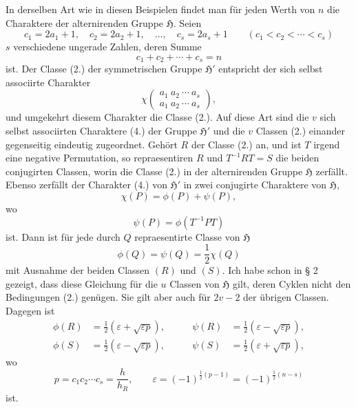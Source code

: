 \documentclass[11pt]{article}
\newcommand{\Hgr}{\mathfrak{H}}
\newcommand{\eps}{\varepsilon}
\newcommand{\ch}[2]{\left(\begin{smallmatrix}#1\\#2\end{smallmatrix}\right)}
\begin{document}
In derselben Art wie in diesen Beispielen findet man für jeden Werth von $n$ die Charaktere der alternirenden Gruppe $\Hgr$. Seien
\begin{equation}\tag{2.}
 c_1=2a_1+1,	\quad c_2=2a_2+1,	\quad \ldots,	\quad c_s=2a_s+1\qquad(c_1<c_2<\cdots<c_s)
\end{equation}
$s$ verschiedene ungerade Zahlen, deren Summe
\begin{equation}\tag{3.}
 c_1+c_2+\cdots+c_s=n
\end{equation}
ist. Der Classe (2.) der symmetrischen Gruppe $\Hgr'$ entspricht der sich selbst associirte Charakter
\begin{equation}\tag{4.}
 \chi\ch{a_1\ a_2\ \cdots\ a_s}{a_1\ a_2\ \cdots\ a_s},
\end{equation}
und umgekehrt diesem Charakter die Classe (2.). Auf diese Art sind die $v$ sich selbst associirten Charaktere (4.) der Gruppe $\Hgr'$ und die $v$ Classen (2.) einander gegenseitig eindeutig zugeordnet. Gehört $R$ der Classe (2.) an, und ist $T$ irgend eine negative Permutation, so repraesentiren $R$ und $T^{-1}RT=S$ die beiden conjugirten Classen, worin die Classe (2.) in der alternirenden Gruppe $\Hgr$ zerfällt. Ebenso zerfällt der Charakter (4.) von $\Hgr'$ in zwei conjugirte Charaktere von $\Hgr$,
\begin{equation}\tag{5.}
 \chi(P)=\phi(P)+\psi(P),
\end{equation}
wo
\[
 \psi(P)=\phi(T^{-1}PT)
\]
ist. Dann ist für jede durch $Q$ repraesentirte Classe von $\Hgr$
\begin{equation}\tag{6.}
 \phi(Q)=\psi(Q)=\frac12\chi(Q)
\end{equation}
mit Ausnahme der beiden Classen $(R)$ und $(S)$. Ich habe schon in § 2 gezeigt, dass diese Gleichung für die $u$ Classen von $\Hgr$ gilt, deren Cyklen nicht den Bedingungen (2.) genügen. Sie gilt aber auch für $2v-2$ der übrigen Classen. Dagegen ist
\begin{equation}\tag{7.}
\begin{aligned}
 \phi(R)&=\frac12(\eps+\sqrt{\eps p}),&\qquad \psi(R)&=\frac12(\eps-\sqrt{\eps p}),\\
 \phi(S)&=\frac12(\eps-\sqrt{\eps p}),&\qquad \psi(S)&=\frac12(\eps+\sqrt{\eps p}),
\end{aligned}
\end{equation}
wo
\begin{equation}\tag{8.}
 p=c_1c_2\cdots c_s=\frac{h}{h_R},	\qquad \eps=(-1)^{\frac12(p-1)}=(-1)^{\frac12(n-s)}
\end{equation}
ist.
\end{document}
